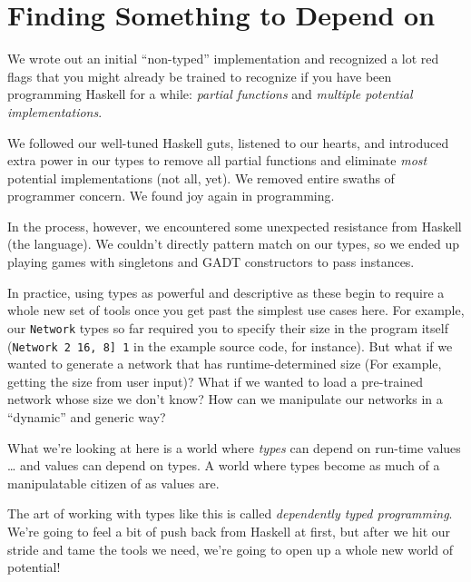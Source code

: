 \documentclass[]{article}
\begin{document}
\section{Finding Something to Depend
on}\label{finding-something-to-depend-on}

We wrote out an initial ``non-typed'' implementation and recognized a
lot red flags that you might already be trained to recognize if you have
been programming Haskell for a while: \emph{partial functions} and
\emph{multiple potential implementations}.

We followed our well-tuned Haskell guts, listened to our hearts, and
introduced extra power in our types to remove all partial functions and
eliminate \emph{most} potential implementations (not all, yet). We
removed entire swaths of programmer concern. We found joy again in
programming.

In the process, however, we encountered some unexpected resistance from
Haskell (the language). We couldn't directly pattern match on our types,
so we ended up playing games with singletons and GADT constructors to
pass instances.

In practice, using types as powerful and descriptive as these begin to
require a whole new set of tools once you get past the simplest use
cases here. For example, our \texttt{Network} types so far required you
to specify their size in the program itself
(\texttt{Network\ 2\ \textquotesingle{}{[}16,\ 8{]}\ 1} in the example
source code, for instance). But what if we wanted to generate a network
that has runtime-determined size (For example, getting the size from
user input)? What if we wanted to load a pre-trained network whose size
we don't know? How can we manipulate our networks in a ``dynamic'' and
generic way?

What we're looking at here is a world where \emph{types} can depend on
run-time values \ldots{} and values can depend on types. A world where
types become as much of a manipulatable citizen of as values are.

The art of working with types like this is called \emph{dependently
typed programming}. We're going to feel a bit of push back from Haskell
at first, but after we hit our stride and tame the tools we need, we're
going to open up a whole new world of potential!
\end{document}

